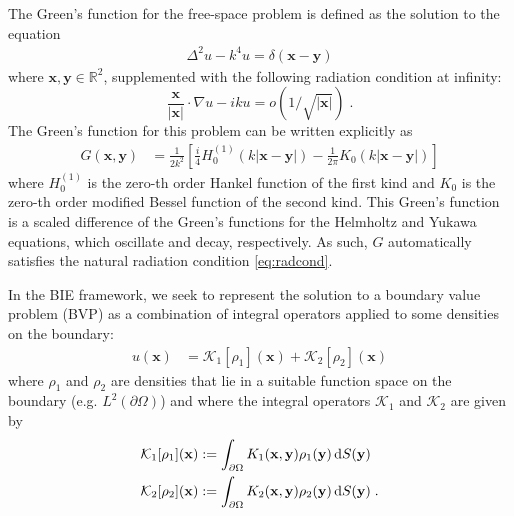 \documentclass[preprint,12pt,3p]{elsarticle}
\newcommand{\dd}{ {\rm d} }
\newcommand{\bx}{{\mathbf{x}}}
\begin{document}
The Green's function for the free-space problem is defined as the solution to the equation
\begin{align}
    \Delta^2 u - k^4 u = \delta(\mathbf{x} - \mathbf{y})
\end{align}
where $\mathbf{x},\mathbf{y} \in  \mathbb{R}^2$, supplemented with the following radiation condition at infinity:
\begin{equation}
\label{eq:radcond}
   \frac{\bx}{|\bx|} \cdot \nabla u - i k u = o(1/\sqrt{|\bx|}) \; . 
\end{equation}
The Green's function for this problem can be written explicitly as 
\begin{align}
    G(\mathbf{x},\mathbf{y}) &=  \frac{1}{2k^2} \left[ \frac{i}{4} H_0^{(1)} (k |\mathbf{x} - \mathbf{y}|) - \frac{1}{2\pi} K_0 (k | \mathbf{x} - \mathbf{y}|) \right] \label{greens} 
\end{align}
 where $H_0^{(1)}$ is the zero-th order Hankel function of the first kind and $K_0$ is the zero-th order modified Bessel function of the second kind. 
 This Green's function is a scaled difference of the Green's functions for the Helmholtz and Yukawa equations, which oscillate and decay, respectively. As such, $G$ automatically satisfies the natural radiation condition \eqref{eq:radcond}.

In the BIE framework, we seek to represent the solution to a boundary value problem (BVP) as a combination of integral operators applied to some densities on the boundary:
\begin{align}
\label{eq:layerpotential}
    u(\mathbf{x}) &= \mathcal{K}_1 [\rho_1 ](\mathbf{x}) + \mathcal{K}_2 [\rho_2 ](\mathbf{x}) 
\end{align}
where $\rho_1 $ and $\rho_2 $ are densities that lie in a suitable function space on the 
boundary (e.g. $L^2(\partial \Omega)$) and where the integral operators $\mathcal{K}_1$ and $\mathcal{K}_2$ are given by
\begin{align}
    \mathcal{K}_1[\rho_1](\mathbf{x}) &:= \int_{\partial \Omega} K_1(\mathbf{x},\mathbf{y}) \rho_1(\mathbf{y})  \, \dd S(\mathbf{y})  \\
    \mathcal{K}_2[\rho_2](\mathbf{x}) &:= \int_{\partial \Omega} K_2(\mathbf{x},\mathbf{y}) \rho_2(\mathbf{y})  \, \dd S(\mathbf{y})  \; .
\end{align}
\end{document}
